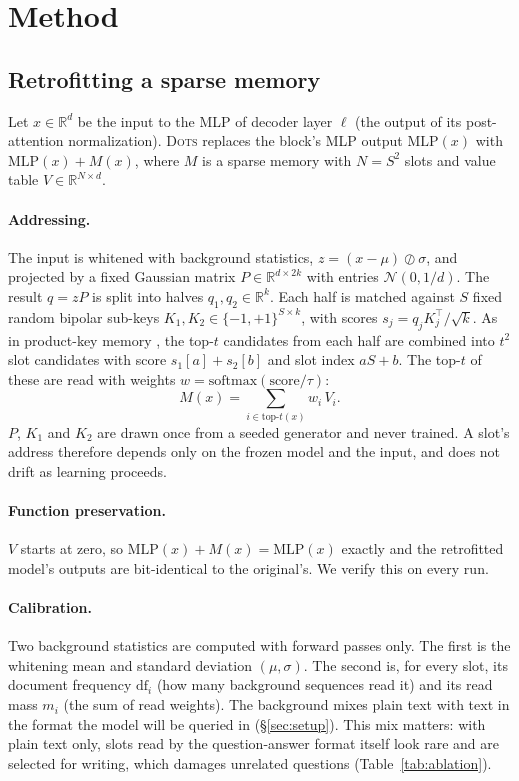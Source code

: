 \documentclass[journal]{IEEEtran}
\newcommand{\sys}{\textsc{Dots}}
\let\citep\cite \let\citet\cite
\begin{document}
\section{Method}

\subsection{Retrofitting a sparse memory}
\label{sec:retrofit}

Let $x \in \mathbb{R}^{d}$ be the input to the MLP of decoder layer $\ell$ (the output of its post-attention normalization). \sys{} replaces the block's MLP output $\mathrm{MLP}(x)$ with $\mathrm{MLP}(x) + M(x)$, where $M$ is a sparse memory with $N = S^2$ slots and value table $V \in \mathbb{R}^{N \times d}$.

\paragraph{Addressing.} The input is whitened with background statistics, $z = (x-\mu)\oslash\sigma$, and projected by a fixed Gaussian matrix $P \in \mathbb{R}^{d\times 2k}$ with entries $\mathcal{N}(0, 1/d)$. The result $q = zP$ is split into halves $q_1, q_2 \in \mathbb{R}^{k}$. Each half is matched against $S$ fixed random bipolar sub-keys $K_1, K_2 \in \{-1,+1\}^{S\times k}$, with scores $s_j = q_j K_j^\top/\sqrt{k}$. As in product-key memory \citep{lample2019pkm}, the top-$t$ candidates from each half are combined into $t^2$ slot candidates with score $s_1[a]+s_2[b]$ and slot index $aS+b$. The top-$t$ of these are read with weights $w = \mathrm{softmax}(\text{score}/\tau)$:
\begin{equation}
M(x) = \sum_{i \in \mathrm{top}\text{-}t(x)} w_i\, V_i .
\end{equation}
$P$, $K_1$ and $K_2$ are drawn once from a seeded generator and never trained. A slot's address therefore depends only on the frozen model and the input, and does not drift as learning proceeds.

\paragraph{Function preservation.} $V$ starts at zero, so $\mathrm{MLP}(x) + M(x) = \mathrm{MLP}(x)$ exactly and the retrofitted model's outputs are bit-identical to the original's. We verify this on every run.

\paragraph{Calibration.} Two background statistics are computed with forward passes only. The first is the whitening mean and standard deviation $(\mu, \sigma)$. The second is, for every slot, its document frequency $\mathrm{df}_i$ (how many background sequences read it) and its read mass $m_i$ (the sum of read weights). The background mixes plain text with text in the format the model will be queried in (\S\ref{sec:setup}). This mix matters: with plain text only, slots read by the question-answer format itself look rare and are selected for writing, which damages unrelated questions (Table~\ref{tab:ablation}).
\end{document}
